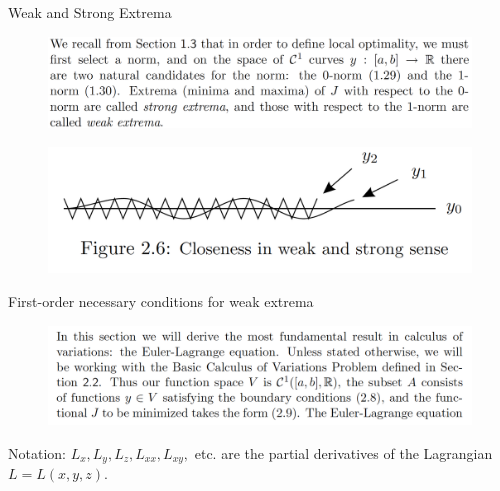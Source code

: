 \documentclass{beamer}
\begin{document}
\begin{frame}{Weak and Strong Extrema}
    \begin{figure}
        \centering
        \includegraphics[width=\linewidth]{ch2/fig7.png}
    \end{figure}

    \begin{figure}
        \centering
        \includegraphics[width=\linewidth]{ch2/fig8.png}
    \end{figure}
\end{frame}

\begin{frame}{First-order necessary conditions for weak extrema}
    \begin{figure}
        \centering
        \includegraphics[width=\linewidth]{ch2/fig9.png}
    \end{figure}
    Notation: $L_x, L_y, L_z, L_{xx}, L_{xy},$ etc. are the partial derivatives of the Lagrangian $L = L(x, y, z)$.
\end{frame}
\end{document}
